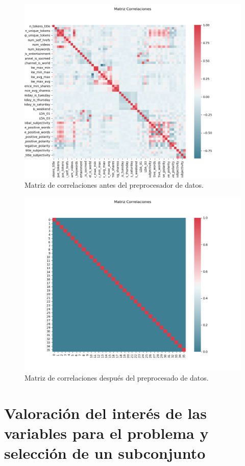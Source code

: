 \documentclass[size=a4, parskip=half, titlepage=false, toc=flat, toc=bib, 12pt]{scrartcl}
\begin{document}
\begin{figure}[H]
\centering
\includegraphics[width=1\textwidth]{./img/antespre}
\caption{Matriz de correlaciones antes del preprocesador de datos.}
\end{figure}
\begin{figure}[H]
\centering
\includegraphics[width=1\textwidth]{./img/despuespre}
\caption{Matriz de correlaciones después del preprocesado de datos.}
\end{figure}

\section{Valoración del interés de las variables para el problema y selección de un subconjunto}
\end{document}
